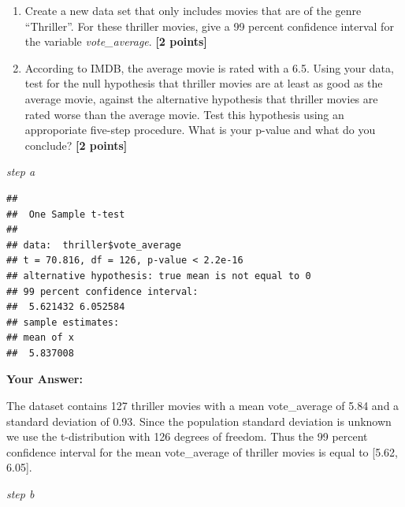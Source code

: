 \documentclass[
]{article}
\newenvironment{Shaded}{\begin{snugshade}}{\end{snugshade}}
\newcommand{\AttributeTok}[1]{\textcolor[rgb]{0.13,0.29,0.53}{#1}}
\newcommand{\FloatTok}[1]{\textcolor[rgb]{0.00,0.00,0.81}{#1}}
\newcommand{\FunctionTok}[1]{\textcolor[rgb]{0.13,0.29,0.53}{\textbf{#1}}}
\newcommand{\NormalTok}[1]{#1}
\newcommand{\OtherTok}[1]{\textcolor[rgb]{0.56,0.35,0.01}{#1}}
\newcommand{\SpecialCharTok}[1]{\textcolor[rgb]{0.81,0.36,0.00}{\textbf{#1}}}
\newcommand{\StringTok}[1]{\textcolor[rgb]{0.31,0.60,0.02}{#1}}
\begin{document}
\begin{enumerate}
\def\labelenumi{\alph{enumi}.}
\item
  Create a new data set that only includes movies that are of the genre
  ``Thriller''. For these thriller movies, give a 99 percent confidence
  interval for the variable \emph{vote\_average}. \textbf{[2 points]}
\item
  According to IMDB, the average movie is rated with a 6.5. Using your
  data, test for the null hypothesis that thriller movies are at least
  as good as the average movie, against the alternative hypothesis that
  thriller movies are rated worse than the average movie. Test this
  hypothesis using an approporiate five-step procedure. What is your
  p-value and what do you conclude? \textbf{[2 points]}
\end{enumerate}

\emph{step a}

\begin{Shaded}
\end{Shaded}

\begin{verbatim}
## 
##  One Sample t-test
## 
## data:  thriller$vote_average
## t = 70.816, df = 126, p-value < 2.2e-16
## alternative hypothesis: true mean is not equal to 0
## 99 percent confidence interval:
##  5.621432 6.052584
## sample estimates:
## mean of x 
##  5.837008
\end{verbatim}

\textbf{Your Answer:}

The dataset contains 127 thriller movies with a mean vote\_average of
5.84 and a standard deviation of 0.93. Since the population standard
deviation is unknown we use the t-distribution with 126 degrees of
freedom. Thus the 99 percent confidence interval for the mean
vote\_average of thriller movies is equal to {[}5.62, 6.05{]}.

\emph{step b}

\begin{Shaded}
\end{Shaded}
\end{document}
